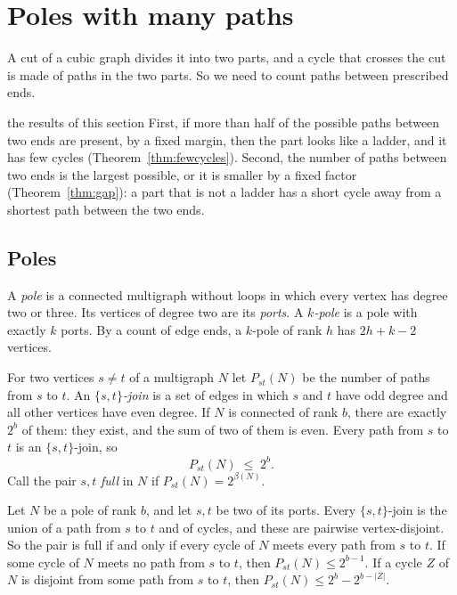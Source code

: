 \section{Poles with many paths}\label{sec:poles}

A cut of a cubic graph divides it into two parts, and a cycle that crosses the cut is made of
paths in the two parts. So we need to count paths between prescribed ends.

\begin{idea}{the results of this section}
First, if more than half of the possible paths between two ends are present, by a fixed margin,
then the part looks like a ladder, and it has few cycles (Theorem~\ref{thm:fewcycles}). Second,
the number of paths between two ends is the largest possible, or it is smaller by a fixed factor
(Theorem~\ref{thm:gap}): a part that is not a ladder has a short cycle away from a shortest
path between the two ends.
\end{idea}

\subsection{Poles}

A \emph{pole} is a connected multigraph without loops in which every vertex has degree two or
three. Its vertices of degree two are its \emph{ports}. A \emph{$k$-pole} is a pole with exactly
$k$ ports. By a count of edge ends, a $k$-pole of rank $h$ has $2h+k-2$ vertices.

For two vertices $s\ne t$ of a multigraph $N$ let $P_{st}(N)$ be the number of paths from $s$ to
$t$. An \emph{$\{s,t\}$-join} is a set of edges in which $s$ and $t$ have odd degree and all other
vertices have even degree. If $N$ is connected of rank $b$, there are exactly $2^{b}$ of them: they
exist, and the sum of two of them is even. Every path from $s$ to $t$ is an $\{s,t\}$-join, so
\begin{equation}\label{eq:joinbound}
  P_{st}(N)\;\le\;2^{b}.
\end{equation}
Call the pair $s,t$ \emph{full} in $N$ if $P_{st}(N)=2^{\beta(N)}$.

\begin{lemma}[Joins]\label{lem:joins}
Let $N$ be a pole of rank $b$, and let $s,t$ be two of its ports. Every $\{s,t\}$-join is the union
of a path from $s$ to $t$ and of cycles, and these are pairwise vertex-disjoint. So the pair is
full if and only if every cycle of $N$ meets every path from $s$ to $t$. If some cycle of $N$ meets
no path from $s$ to $t$, then $P_{st}(N)\le2^{b-1}$. If a cycle $Z$ of $N$ is disjoint from some
path from $s$ to $t$, then $P_{st}(N)\le2^{b}-2^{b-|Z|}$.
\end{lemma}

